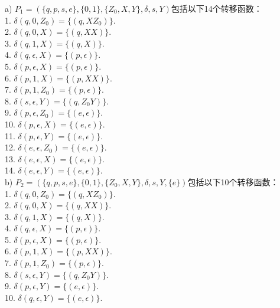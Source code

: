 \begin{solution}
a)
$P_1=(\{q,p,s,e\},\{0,1\},\{Z_0,X,Y\},\delta,s,Y)$包括以下14个转移函数：\\
1. $\delta(q,0,Z_0) = \{(q,XZ_0)\}$.\\
2. $\delta(q,0,X) = \{(q,XX)\}$.\\
3. $\delta(q,1,X) = \{(q,X)\}$.\\
4. $\delta(q,\epsilon,X) = \{(p,\epsilon)\}$.\\
5. $\delta(p,\epsilon,X) = \{(p,\epsilon)\}$.\\
6. $\delta(p,1,X) = \{(p,XX)\}$.\\
7. $\delta(p,1,Z_0) = \{(p,\epsilon)\}$.\\

8. $\delta(s,\epsilon,Y) = \{(q,Z_0Y)\}$.\\

9. $\delta(p,\epsilon,Z_0) = \{(e,\epsilon)\}$.\\
10. $\delta(p,\epsilon,X) = \{(e,\epsilon)\}$.\\
11. $\delta(p,\epsilon,Y) = \{(e,\epsilon)\}$.\\
12. $\delta(e,\epsilon,Z_0) = \{(e,\epsilon)\}$.\\
13. $\delta(e,\epsilon,X) = \{(e,\epsilon)\}$.\\
14. $\delta(e,\epsilon,Y) = \{(e,\epsilon)\}$.\\

b)
$P_2=(\{q,p,s,e\},\{0,1\},\{Z_0,X,Y\},\delta,s,Y,\{e\})$包括以下10个转移函数：\\
1. $\delta(q,0,Z_0) = \{(q,XZ_0)\}$.\\
2. $\delta(q,0,X) = \{(q,XX)\}$.\\
3. $\delta(q,1,X) = \{(q,X)\}$.\\
4. $\delta(q,\epsilon,X) = \{(p,\epsilon)\}$.\\
5. $\delta(p,\epsilon,X) = \{(p,\epsilon)\}$.\\
6. $\delta(p,1,X) = \{(p,XX)\}$.\\
7. $\delta(p,1,Z_0) = \{(p,\epsilon)\}$.\\

8. $\delta(s,\epsilon,Y) = \{(q,Z_0Y)\}$.\\

9. $\delta(p,\epsilon,Y) = \{(e,\epsilon)\}$.\\
10. $\delta(q,\epsilon,Y) = \{(e,\epsilon)\}$.\\


\end{solution}